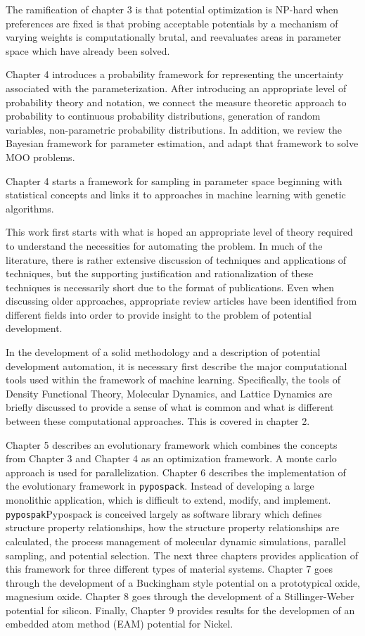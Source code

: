 The ramification of chapter 3 is that potential optimization is NP-hard when preferences are fixed is that probing acceptable potentials by a mechanism of varying weights is computationally brutal, and reevaluates areas in parameter space which have already been solved.

Chapter 4 introduces a probability framework for representing the uncertainty associated with the parameterization.   After introducing an appropriate level of probability theory and notation, we connect the measure theoretic approach to probability to continuous probability distributions, generation of random variables, non-parametric probability distributions.  In addition, we review the Bayesian framework for parameter estimation, and adapt that framework to solve MOO problems.

Chapter 4 starts a framework for sampling in parameter space beginning with statistical concepts and links it to approaches in machine learning with genetic algorithms.

This work first starts with what is hoped an appropriate level of theory required to understand the necessities for automating the problem.
In much of the literature, there is rather extensive discussion of techniques and applications of techniques, but the supporting justification and rationalization of these techniques is necessarily short due to the format of publications.
Even when discussing older approaches, appropriate review articles have been identified from different fields into order to provide insight to the problem of potential development.


In the development of a solid methodology and a description of potential development automation, it is necessary first describe the major computational tools used within the framework of machine learning.  Specifically, the tools of Density Functional Theory, Molecular Dynamics, and Lattice Dynamics are briefly discussed to provide a sense of what is common and what is different between these computational approaches.  This is covered in chapter 2.

Chapter 5 describes an evolutionary framework which combines the concepts from Chapter 3 and Chapter 4 as an optimization framework.  
A monte carlo approach is used for parallelization.
Chapter 6 describes the implementation of the evolutionary framework in \verb|pypospack|.  Instead of developing a large monolithic application, which is difficult to extend, modify, and implement.  
\verb|pypospak|Pypospack is conceived largely as software library which defines structure property relationships, how the structure property relationships are calculated, the process management of molecular dynamic simulations, parallel sampling, and potential selection.
The next three chapters provides application of this framework for three different types of material systems.  Chapter 7 goes through the development of a Buckingham style potential on a prototypical oxide, magnesium oxide.  Chapter 8 goes through the development of a Stillinger-Weber potential for silicon.  Finally, Chapter 9 provides results for the developmen of an embedded atom method (EAM) potential for Nickel.

